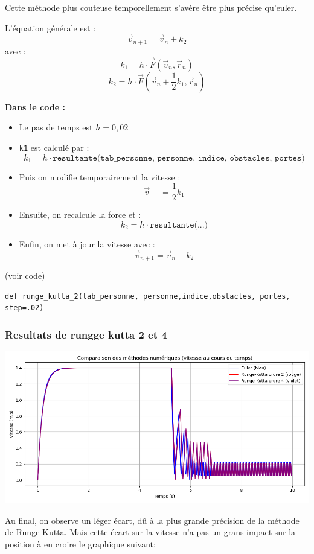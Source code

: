 \documentclass[a4paper,12pt]{article}
\begin{document}
Cette méthode plus couteuse temporellement s'avére être plus précise qu'euler.

L’équation générale est :
\[
\vec{v}_{n+1} = \vec{v}_n + k_2
\]
avec :
\[
k_1 = h \cdot \vec{F}(\vec{v}_n, \vec{r}_n)
\]
\[
k_2 = h \cdot \vec{F} \left( \vec{v}_n + \frac{1}{2}k_1, \vec{r}_n \right)
\]

\textbf{Dans le code :}
\begin{itemize}
    \item Le pas de temps est $h = 0{,}02$
    \item \texttt{k1} est calculé par :
    \[
    k_1 = h \cdot \texttt{resultante(tab\_personne, personne, indice, obstacles, portes)}
    \]
    \item Puis on modifie temporairement la vitesse :
    \[
    \vec{v} \mathrel{+}= \frac{1}{2} k_1
    \]
    \item Ensuite, on recalcule la force et :
    \[
    k_2 = h \cdot \texttt{resultante(...)}
    \]
    \item Enfin, on met à jour la vitesse avec :
    \[
    \vec{v}_{n+1} = \vec{v}_n + k_2
    \]
\end{itemize}
(voir code)
\begin{verbatim}
def runge_kutta_2(tab_personne, personne,indice,obstacles, portes, step=.02)
\end{verbatim}
\subsubsection{Resultats de rungge kutta 2 et 4}

\includegraphics[width=\textwidth]{runge.png}

Au final, on observe un léger écart, dû à la plus grande précision de la méthode de Runge-Kutta. Mais cette écart sur la vitesse n'a pas un grans impact sur la position à en croire le graphique suivant:
\end{document}
